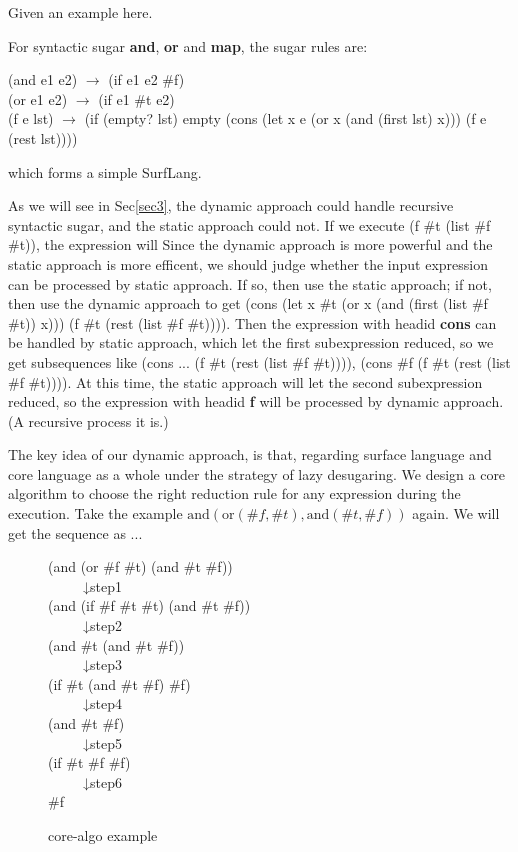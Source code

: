 Given an example here.

For syntactic sugar {\bfseries and}, {\bfseries or} and {\bfseries map}, the sugar rules are:
\begin{center}
	\parbox[t]{\textwidth}{%
		\begin{flushleft}  
			(and e1 e2) $\rightarrow$ (if e1 e2 \#f)\\
			(or e1 e2) $\rightarrow$ (if e1 \#t e2)\\
			(f e lst) $\rightarrow$ (if (empty? lst) empty (cons (let x e (or x (and (first lst) x))) (f e (rest lst))))
		\end{flushleft}  
	}%
\end{center}
which forms a simple SurfLang.

As we will see in Sec\ref{sec3}, the dynamic approach could handle recursive syntactic sugar, and the static approach could not. If we execute (f \#t (list \#f \#t)), the expression will
Since the dynamic approach is more powerful and the static approach is more efficent, we should judge whether the input expression can be processed by static approach. If so, then use the static approach; if not, then use the dynamic approach to get (cons (let x \#t (or x (and (first (list \#f \#t)) x))) (f \#t (rest (list \#f \#t)))). Then the expression with headid {\bfseries cons} can be handled by static approach, which let the first subexpression reduced, so we get subsequences like (cons ... (f \#t (rest (list \#f \#t)))), (cons \#f (f \#t (rest (list \#f \#t)))). At this time, the static approach will let the second subexpression reduced, so the expression with headid {\bfseries f} will be processed by dynamic approach. (A recursive process it is.) 

The key idea of our dynamic approach, is that, regarding surface language and core language as a whole under the strategy of lazy desugaring. We design a core algorithm to choose the right reduction rule for any expression during the execution. Take the example $\mbox{and}(\mbox{or}(\#f, \#t), \mbox{and}(\#t, \#f))$ again. We will get the sequence as ...

\begin{figure}[ht]
\parbox[t]{\textwidth}{
			\begin{center}  
				(and (or \#f \#t) (and \#t \#f))\\
				~~~~~↓step1\\
				(and (if \#f \#t \#t) (and \#t \#f))\\
				~~~~~↓step2\\
				(and \#t (and \#t \#f))\\
				~~~~~↓step3\\
				(if \#t (and \#t \#f) \#f)\\
				~~~~~↓step4\\
				(and \#t \#f)\\
				~~~~~↓step5\\
				(if \#t \#f \#f)\\
				~~~~~↓step6\\
				\#f
			\end{center}  
		}
\caption{core-algo example}
\label{fig:core-algo}
\end{figure}


